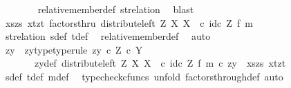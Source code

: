 \begin{isabellebody}
\ \ \ \ \ \ \isamarkupfalse%
\ relative{\isacharunderscore}{\kern0pt}member{\isacharunderscore}{\kern0pt}def{}\ st{\isacharunderscore}{\kern0pt}relation\ \isamarkupfalse%
\ blast\isanewline
\isanewline
\ \ \ \ \isamarkupfalse%
\ {\isachardoublequoteopen}{\isasymlangle}{\isasymlangle}xs{\isacharcomma}{\kern0pt}zs{\isasymrangle}{\isacharcomma}{\kern0pt}\ {\isasymlangle}xt{\isacharcomma}{\kern0pt}zt{\isasymrangle}{\isasymrangle}\ factorsthru\ {\isacharparenleft}{\kern0pt}distribute{\isacharunderscore}{\kern0pt}left\ Z\ X\ X\ \ {\isasymcirc}\isactrlsub c\ {\isacharparenleft}{\kern0pt}id\isactrlsub c\ Z\ {\isasymtimes}\isactrlsub f\ m{\isacharparenright}{\kern0pt}{\isacharparenright}{\kern0pt}{\isachardoublequoteclose}\isanewline
\ \ \ \ \ \ \isamarkupfalse%
\ st{\isacharunderscore}{\kern0pt}relation\ s{\isacharunderscore}{\kern0pt}def\ t{\isacharunderscore}{\kern0pt}def\ \isamarkupfalse%
\ relative{\isacharunderscore}{\kern0pt}member{\isacharunderscore}{\kern0pt}def{}\ \isamarkupfalse%
\ auto\isanewline
\ \ \ \ \isamarkupfalse%
\ \isamarkupfalse%
\ zy\ \ zy{\isacharunderscore}{\kern0pt}type{\isacharbrackleft}{\kern0pt}type{\isacharunderscore}{\kern0pt}rule{\isacharbrackright}{\kern0pt}{\isacharcolon}{\kern0pt}\ {\isachardoublequoteopen}zy\ {\isasymin}\isactrlsub c\ Z\ {\isasymtimes}\isactrlsub c\ Y{\isachardoublequoteclose}\isanewline
\ \ \ \ \ \ \ zy{\isacharunderscore}{\kern0pt}def{\isacharcolon}{\kern0pt}\ {\isachardoublequoteopen}{\isacharparenleft}{\kern0pt}distribute{\isacharunderscore}{\kern0pt}left\ Z\ X\ X\ \ {\isasymcirc}\isactrlsub c\ {\isacharparenleft}{\kern0pt}id\isactrlsub c\ Z\ {\isasymtimes}\isactrlsub f\ m{\isacharparenright}{\kern0pt}{\isacharparenright}{\kern0pt}\ {\isasymcirc}\isactrlsub c\ zy\ {\isacharequal}{\kern0pt}\ {\isasymlangle}{\isasymlangle}xs{\isacharcomma}{\kern0pt}zs{\isasymrangle}{\isacharcomma}{\kern0pt}\ {\isasymlangle}xt{\isacharcomma}{\kern0pt}zt{\isasymrangle}{\isasymrangle}{\isachardoublequoteclose}\isanewline
\ \ \ \ \ \ \isamarkupfalse%
\ s{\isacharunderscore}{\kern0pt}def\ t{\isacharunderscore}{\kern0pt}def\ m{\isacharunderscore}{\kern0pt}def\ \isamarkupfalse%
\ {\isacharparenleft}{\kern0pt}typecheck{\isacharunderscore}{\kern0pt}cfuncs{\isacharcomma}{\kern0pt}\ unfold\ factors{\isacharunderscore}{\kern0pt}through{\isacharunderscore}{\kern0pt}def{}{\isacharcomma}{\kern0pt}\ auto{\isacharparenright}{\kern0pt}\isanewline

\end{isabellebody}
